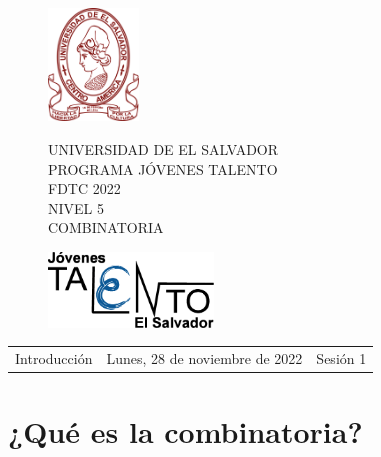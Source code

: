 \documentclass[12pt]{article}
\newcommand{\tema}{Introducción}
\newcommand{\fecha}{Lunes, 28 de noviembre de 2022}
\newcommand{\sesion}{Sesión 1}
\begin{document}
\thispagestyle{empty}

\begin{figure}[h] 
	\begin{minipage}[b]{0.26\textwidth}
		\begin{center}
			\includegraphics[height=3cm]{Logos/UES.png}
			\par\end{center}
	\end{minipage} 
	\begin{minipage}[b]{0.46\textwidth}
		\begin{center}
			UNIVERSIDAD DE EL SALVADOR\\ [0.1cm]
			PROGRAMA JÓVENES TALENTO\\ [0.1cm]
	        FDTC 2022\\ [0.1cm]
                NIVEL 5\\ [0.1cm]
			COMBINATORIA 
			\par\end{center}
	\end{minipage} 
	\begin{minipage}[b]{0.05\textwidth}
		\begin{center}
			\includegraphics[height=2cm]{Logos/LOGO PJT.png}
			\par\end{center}
	\end{minipage}
\end{figure}

\begin{center}
    \begin{tabular}{p{4.5cm} p{7cm} p{4.5cm}}
        \tema & \centering\fecha & \hfill\sesion
    \end{tabular}
\end{center}

\section{¿Qué es la combinatoria?}
\end{document}
